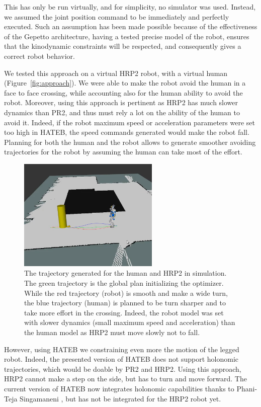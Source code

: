 \documentclass[a4paper,11pt,twoside]{StyleThese}
\begin{document}
This has only be run virtually, and for simplicity, no simulator was used. Instead, we assumed the joint position command to be immediately and perfectly executed. Such an assumption has been made possible because of the effectiveness of the Gepetto architecture, having a tested precise model of the robot, ensures that the kinodynamic constraints will be respected, and consequently gives a correct robot behavior.

We tested this approach on a virtual HRP2 robot, with a virtual human (Figure~\ref{fig:approach}). We were able to make the robot avoid the human in a face to face crossing, while accounting also for the human ability to avoid the robot. Moreover, using this approach is pertinent as HRP2 has much slower dynamics than PR2, and thus must rely a lot on the ability of the human to avoid it. Indeed, if the robot maximum speed or acceleration parameters were set too high in HATEB, the speed commands generated would make the robot fall. Planning for both the human and the robot allows to generate smoother avoiding trajectories for the robot by assuming the human can take most of the effort. 

\begin{figure}[hbtp]
\centering
\includegraphics[width=0.6\textwidth]{figures/chapter2/Chap2HRP2.png}
\caption{The trajectory generated for the human and HRP2 in simulation. The green trajectory is the global plan initializing the optimizer. While the red trajectory (robot) is smooth and make a wide turn, the blue trajectory (human) is planned to be turn sharper and to take more effort in the crossing. Indeed, the robot model was set with slower dynamics (small maximum speed and acceleration) than the human model as HRP2 must move slowly not to fall.}
\label{fig:hrp2}
\end{figure}

However, using HATEB we constraining even more the motion of the legged robot. Indeed, the presented version of HATEB does not support holonomic trajectories, which would be doable by PR2 and HRP2. Using this approach, HRP2 cannot make a step on the side, but has to turn and move forward. The current version of HATEB now integrates holonomic capabilities thanks to Phani-Teja Singamaneni \cite{singamaneni2020hateb}, but has not be integrated for the HRP2 robot yet.	
\end{document}
